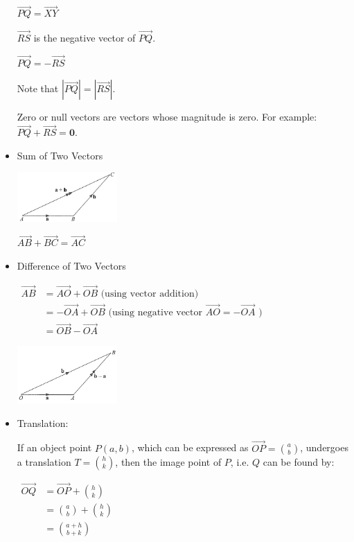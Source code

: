 \documentclass[twocolumn]{article}
\begin{document}
\begin{itemize}
$
\overrightarrow{P Q}=\overrightarrow{X Y}
$

$\overrightarrow{R S}$ is the negative vector of $\overrightarrow{P Q}$.

$
\overrightarrow{P Q}=-\overrightarrow{R S}
$

Note that $|\overrightarrow{P Q}|=|\overrightarrow{R S}|$.

Zero or null vectors are vectors whose magnitude is zero. For example: $\overrightarrow{P Q}+\overrightarrow{R S}=\mathbf{0}$.

\item Sum of Two Vectors

\includegraphics[width=0.3\textwidth]{204.png}

$\overrightarrow{A B}+\overrightarrow{B C}=\overrightarrow{A C}$

\item Difference of Two Vectors

$
\begin{aligned}
	\overrightarrow{A B} & =\overrightarrow{A O}+\overrightarrow{O B} \text { (using vector addition) } \\
	& = - \overrightarrow{O A}+\overrightarrow{O B} \text { (using negative vector } \overrightarrow{A O}=-\overrightarrow{O A} \text { ) } \\
	& =\overrightarrow{O B}-\overrightarrow{O A}
\end{aligned}
$

\includegraphics[width=0.3\textwidth]{205.png}

\item Translation:

If an object point $P(a, b)$, which can be expressed as $\overrightarrow{O P}=\binom{a}{b}$, undergoes a translation $T=\binom{h}{k}$, then the image point of $P$, i.e. $Q$ can be found by:

$
\begin{aligned}
	\overrightarrow{O Q} & =\overrightarrow{O P}+\binom{h}{k} \\
	& =\binom{a}{b}+\binom{h}{k} \\
	& =\binom{a+h}{b+k}
\end{aligned}
$


\end{itemize}
\end{document}
